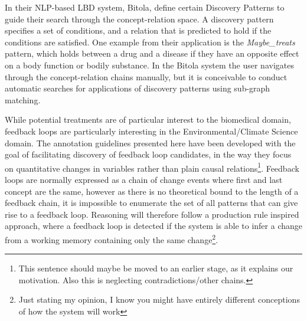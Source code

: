 \documentclass[10pt, a4paper]{article}
\begin{document}
In their NLP-based LBD system, Bitola,  define certain Discovery Patterns to guide their search through the concept-relation space. A discovery pattern specifies a set of conditions, and a relation that is predicted to hold if the conditions are satisfied. One example from their application is the \emph{Maybe\_treats} pattern, which holds between a drug and a disease if they have an opposite effect on a body function or bodily substance. In the Bitola system the user navigates through the concept-relation chains manually, but it is conceivable to conduct automatic searches for applications of discovery patterns using sub-graph matching.

While potential treatments are of particular interest to the biomedical domain, feedback loops are particularly interesting in the Environmental/Climate Science domain. 
The annotation guidelines presented here have been developed with the goal of facilitating discovery of feedback loop candidates, in the way they focus on quantitative changes in variables rather than plain causal relations\footnote{This sentence should maybe be moved to an earlier stage, as it explains our motivation. Also this is neglecting contradictions/other chains.}.
Feedback loops are normally expressed as a chain of change events where first and last concept are the same, however as there is no theoretical bound to the length of a feedback chain, it is impossible to enumerate the set of all patterns that can give rise to a feedback loop.
Reasoning will therefore follow a production rule inspired approach, where a feedback loop is detected if the system is able to infer a change from a working memory containing only the same change\footnote{Just stating my opinion, I know you might have entirely different conceptions of how the system will work}.


\end{document}

